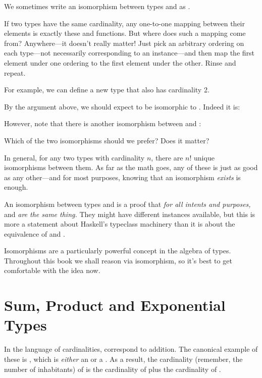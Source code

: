 \documentclass[book.tex]{subfiles}
\begin{document}
We sometimes write an isomorphism between types  and  as .

If two types have the same cardinality, any one-to-one mapping between their
elements is exactly these  and  functions. But where does such a
mapping come from? Anywhere---it doesn't really matter! Just pick an arbitrary
ordering on each type---not necessarily corresponding to an 
instance---and then map the first element under one ordering to the first
element under the other. Rinse and repeat.

For example, we can define a new type that also has cardinality 2.


By the argument above, we should expect  to be isomorphic to .
Indeed it is:


However, note that there is another isomorphism between  and
:


Which of the two isomorphisms should we prefer? Does it matter?

In general, for any two types with cardinality $n$, there
are $n!$ unique isomorphisms between them. As far as the math goes, any of these
is just as good as any other---and for most purposes, knowing that an
isomorphism \emph{exists} is enough.

An isomorphism between types  and  is a proof that \emph{for all
intents and purposes,}  and  \emph{are the same thing.} They might
have different instances available, but this is more a statement about Haskell's
typeclass machinery than it is about the equivalence of  and .

Isomorphisms are a particularly powerful concept in the algebra of types.
Throughout this book we shall reason via isomorphism, so it's best to get
comfortable with the idea now.


\section{Sum, Product and Exponential Types}

In the language of cardinalities,  correspond to
addition. The canonical example of these is , which is
\emph{either} an  or a . As a result, the cardinality (remember, the
number of inhabitants) of  is the cardinality of  plus the
cardinality of .
\end{document}
